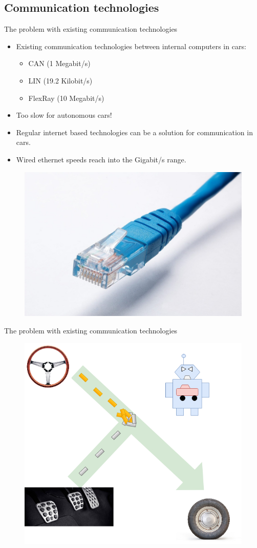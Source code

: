 \documentclass{beamer}
\begin{document}
\subsection{Communication technologies}
\begin{frame}{The problem with existing communication technologies}
    \begin{itemize}
        \item Existing communication technologies between internal computers in cars:
            \begin{itemize}
                \item CAN (1 Megabit/s)
                \item LIN (19.2 Kilobit/s)
                \item FlexRay (10 Megabit/s)
            \end{itemize}
        \item Too slow for autonomous cars!
        \item Regular internet based technologies can be a solution for communication in cars.
        \item Wired ethernet speeds reach into the Gigabit/s range.
    \end{itemize}
    \begin{figure}
        \includegraphics[width=0.3\linewidth]{ethernet_cable.jpg}
    \end{figure}
\end{frame}

\begin{frame}{The problem with existing communication technologies}
    \begin{figure}
        \includegraphics[width=0.7\linewidth]{congesting.png}
    \end{figure}
\end{frame}
\end{document}
